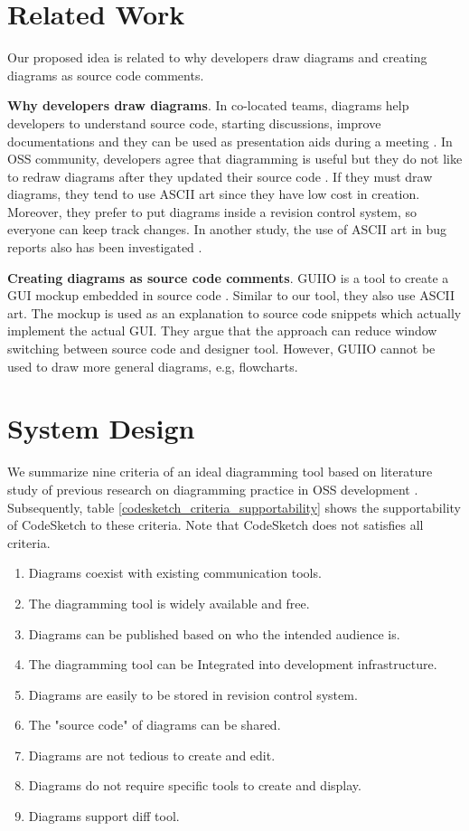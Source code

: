 \documentclass{sig-alternate}
\begin{document}
\section{Related Work}
\label{related_work}
Our proposed idea is related to why developers draw diagrams and creating diagrams as source code comments.

\textbf{Why developers draw diagrams}. In co-located teams, diagrams help developers to understand source code, starting discussions, improve documentations and they can be used as presentation aids during a meeting \cite{Cherubini2007}.  In OSS community, developers agree that diagramming is useful but they do not like to redraw diagrams after they updated their source code  \cite{Yatani2009, Eunyoung2010}. If they must draw diagrams, they tend to use ASCII art since they have low cost in creation. Moreover, they prefer to put diagrams inside a revision control system, so everyone can keep track changes. In another study, the use of ASCII art in bug reports also has been investigated \cite{Twidale2005}.

\textbf{Creating diagrams as source code comments}. GUIIO is a tool to create a GUI mockup embedded in source code \cite{Simpson2011}. Similar to our tool, they also use ASCII art. The mockup is used as an explanation to source code snippets which actually implement the actual GUI. They argue that the approach can reduce window switching between source code and designer tool. However, GUIIO cannot be used to draw more general diagrams, e.g, flowcharts.

\section{System Design}
\label{system_design}
We summarize nine criteria of an ideal diagramming tool based on literature study of previous research on diagramming practice in OSS development  \cite{Yatani2009, Eunyoung2010}. 
Subsequently, table \ref{codesketch_criteria_supportability} shows the supportability of CodeSketch to these criteria. Note that CodeSketch does not satisfies all criteria.


\begin{enumerate} [nolistsep]
\item Diagrams coexist with existing communication tools. 
\item The diagramming tool is widely available and free. 
\item Diagrams can be published based on who the intended audience is. 
\item The diagramming tool can be Integrated into development infrastructure.
\item Diagrams are easily to be stored in revision control system. 
\item The "source code" of diagrams can be shared. 
\item Diagrams are  not tedious to create and edit. 
\item Diagrams do not require specific tools to create and display. 
\item Diagrams support diff tool.
\end{enumerate}
\end{document}
